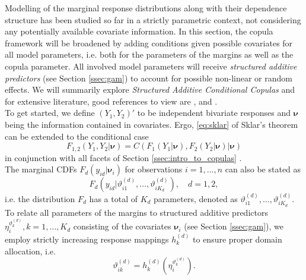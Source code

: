 
Modelling of the marginal response distributions along with their dependence structure has been studied so far in a strictly parametric context, not considering any potentially available covariate information. In this section, the copula framework will be broadened by adding conditions given possible covariates for all model parameters, i.e. both for the parameters of the margins as well as the copula parameter. All involved model parameters will receive \textit{structured additive predictors} (see Section \ref{ssec:gam}) to account for possible non-linear or random effects. We will summarily explore \textit{Structured Additive Conditional Copulas} and for extensive literature, good references to view are \cite{klein2016simultaneous}, \cite{vatter2019gamcopula} and \cite{marra1605bivariate}. \\

To get started, we define $(Y_1, Y_2)'$ to be independent bivariate responses and $\bm{\nu}$ being the information contained in covariates. Ergo, \autoref{eq:sklar} of Sklar's theorem can be extended to the conditional case
\begin{equation}
F_{1,2}\left(Y_{1}, Y_{2} | \bm{\nu} \right)=C\left(F_{1}\left(Y_{1} | \bm{\nu} \right), F_{2}\left(Y_{2} | \bm{\nu} \right) | \bm{\nu} \right)
\label{eq:sklar_conditional}
\end{equation}
in conjunction with all facets of Section \ref{ssec:intro_to_copulas} \citep{patton2006modelling}.\\
The marginal \acp{CDF} $F_{d}\left(y_{i d} | \bm{\nu}_i\right)$ for observations $i = 1,\ldots, n$ can also be stated as
\begin{equation}
F_{d}\left(y_{i d} | \vartheta_{i 1}^{(d)}, \ldots, \vartheta_{i K_{d}}^{(d)}\right), \quad d = 1, 2,
\end{equation}
i.e. the distribution $F_d$ has a total of $K_d$ parameters, denoted as $\vartheta_{i 1}^{(d)}, \ldots, \vartheta_{i K_{d}}^{(d)}$.
To relate all parameters of the margins to structured additive predictors $\eta_i^{\vartheta_k^{(d)}},  k = 1,\ldots, K_d$ consisting of the covariates $\bm{\nu}_i$ (see Section \ref{ssec:gam}), we employ strictly increasing response mappings $h_k^{(d)}$ to ensure proper domain allocation, i.e.
\begin{equation}
\vartheta_{i k}^{(d)}=h_{k}^{(d)}(\eta_{i}^{\vartheta_{k}^{(d)}}).
\label{eq:parameter_mapping}
\end{equation}
\\

